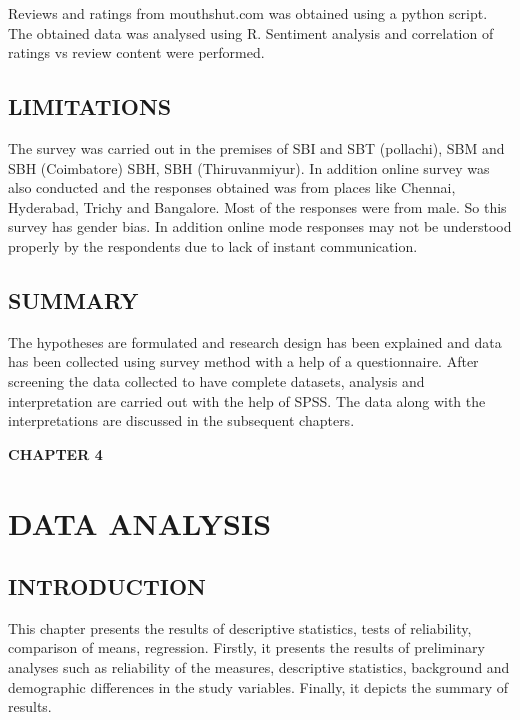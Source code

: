 \documentclass[a4paper, 12pt]{extarticle}
\begin{document}
{Reviews and ratings from mouthshut.com was obtained using a python script. The obtained data was analysed using R. Sentiment analysis and correlation of ratings vs review content were performed.
 

\subsection{LIMITATIONS}
The survey was carried out in the premises of SBI and SBT (pollachi), SBM and SBH (Coimbatore) SBH, SBH (Thiruvanmiyur). In addition online survey was also conducted and the responses obtained was from places like Chennai, Hyderabad, Trichy and Bangalore. Most of the responses were from male. So this survey has gender bias. In addition online mode responses may not be understood properly by the respondents due to lack of instant communication. 

\subsection{SUMMARY}
The hypotheses are formulated and research design has been explained and data has been collected using survey method with a help of a questionnaire. After screening the data collected to have complete datasets, analysis and interpretation are carried out with the help of SPSS. The data along with the interpretations are discussed in the subsequent chapters.

\newpage
\begin{center}
\textbf{\large CHAPTER 4}
\end{center}
\section{DATA ANALYSIS}
\subsection{INTRODUCTION}
This chapter presents the results of descriptive statistics, tests of reliability, comparison of means, regression. Firstly, it presents the results of preliminary analyses such as reliability of the measures, descriptive statistics, background and demographic differences in the study variables. Finally, it depicts the summary of results.

}
\end{document}
